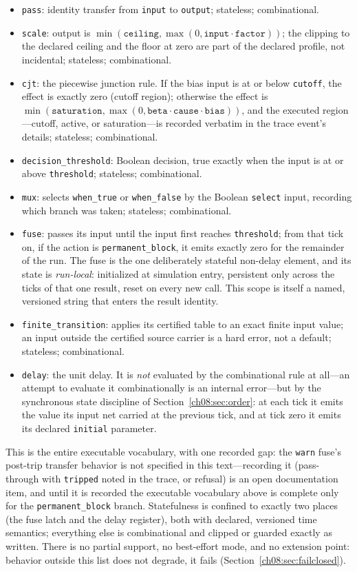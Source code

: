 \begin{itemize}
\item \texttt{pass}: identity transfer from \texttt{input} to \texttt{output}; stateless; combinational.
\item \texttt{scale}: output is $\min(\texttt{ceiling}, \max(0, \texttt{input} \cdot \texttt{factor}))$; the clipping to the declared ceiling and the floor at zero are part of the declared profile, not incidental; stateless; combinational.
\item \texttt{cjt}: the piecewise junction rule. If the bias input is at or below \texttt{cutoff}, the effect is exactly zero (cutoff region); otherwise the effect is $\min(\texttt{saturation}, \max(0, \texttt{beta} \cdot \texttt{cause} \cdot \texttt{bias}))$, and the executed region---cutoff, active, or saturation---is recorded verbatim in the trace event's details; stateless; combinational.
\item \texttt{decision\_threshold}: Boolean decision, true exactly when the input is at or above \texttt{threshold}; stateless; combinational.
\item \texttt{mux}: selects \texttt{when\_true} or \texttt{when\_false} by the Boolean \texttt{select} input, recording which branch was taken; stateless; combinational.
\item \texttt{fuse}: passes its input until the input first reaches \texttt{threshold}; from that tick on, if the action is \texttt{permanent\_block}, it emits exactly zero for the remainder of the run. The fuse is the one deliberately stateful non-delay element, and its state is \emph{run-local}: initialized at simulation entry, persistent only across the ticks of that one result, reset on every new call. This scope is itself a named, versioned string that enters the result identity.
\item \texttt{finite\_transition}: applies its certified table to an exact finite input value; an input outside the certified source carrier is a hard error, not a default; stateless; combinational.
\item \texttt{delay}: the unit delay. It is \emph{not} evaluated by the combinational rule at all---an attempt to evaluate it combinationally is an internal error---but by the synchronous state discipline of Section~\ref{ch08:sec:order}: at each tick it emits the value its input net carried at the previous tick, and at tick zero it emits its declared \texttt{initial} parameter.
\end{itemize}

This is the entire executable vocabulary, with one recorded gap: the \texttt{warn} fuse's post-trip transfer behavior is not specified in this text---recording it (pass-through with \texttt{tripped} noted in the trace, or refusal) is an open documentation item, and until it is recorded the executable vocabulary above is complete only for the \texttt{permanent\_block} branch. Statefulness is confined to exactly two places (the fuse latch and the delay register), both with declared, versioned time semantics; everything else is combinational and clipped or guarded exactly as written. There is no partial support, no best-effort mode, and no extension point: behavior outside this list does not degrade, it fails (Section~\ref{ch08:sec:failclosed}).

